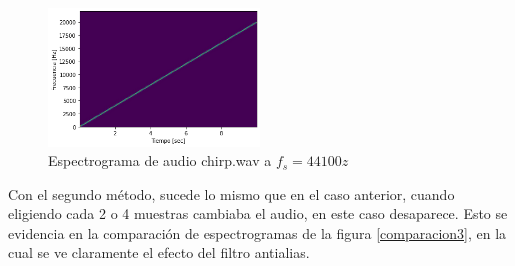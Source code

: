\documentclass[a4paper]{article}
\begin{document}
\begin{figure}[h]
\centering
\includegraphics[width=0.5\textwidth]{chirps.png}
\caption{Espectrograma de audio chirp.wav a $f_s = 44100z$}
\label{chirp}
\end{figure}

\newline 
Con el segundo método, sucede lo mismo que en el caso anterior, cuando eligiendo cada 2 o 4 muestras cambiaba el audio, en este caso desaparece. Esto se evidencia en la comparación de espectrogramas de la figura \ref{comparacion3}, en la cual se ve claramente el efecto del filtro antialias. 
\end{document}

